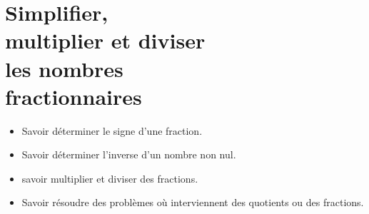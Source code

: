 \chapter{Simplifier,\\
multiplier et diviser\\
les nombres \\fractionnaires}\label{ChSimpMulDivFrac}

\vspace{5cm}
\begin{acquis}
\begin{itemize}
\item Savoir déterminer le signe d'une fraction.
\item Savoir déterminer l'inverse d'un nombre non nul.
\item savoir multiplier et diviser des fractions.
\item Savoir résoudre des problèmes où interviennent des quotients ou des fractions.
\end{itemize}
\end{acquis}


\activites


\cours


\exercicesbase
\begin{colonne*exercice}

\end{colonne*exercice}


\exercicesappr
\begin{colonne*exercice}

\end{colonne*exercice}

\connaissances


\TravauxPratiques


\recreation %



